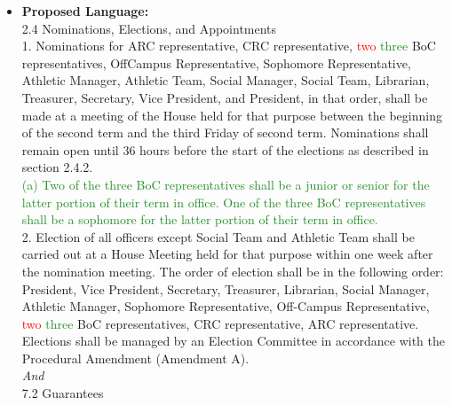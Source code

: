 \documentclass[10pt]{article} %
\begin{document}
\begin{itemize}
	(b) for the entire academic year following the election or appointment provided the officer completes their term. If an officer quits their office mid-term, the room guarantee shall transfer to the succeeding officeholder for the remainder of the guaranteed term. \\
	8. The officer room pick order shall be President, Vice President, Secretary, Treasurer, Librarian, Social Manager, Athletic Manager, Head UCC, On Campus UCCs, IHC Chair, ASCIT President, BoC Chair, Social Team, Athletic Team, House-elected BoC Representatives (up to two members), O’Domhnaill’s Suppliers (up to two members), House Head Waiter (one member), House BFD editors (one member), House Historians (one member).
	\item \textbf{Proposed Language:} \\
	2.4 Nominations, Elections, and Appointments \\
	1. Nominations for ARC representative, CRC representative, \textcolor{red}{two} \textcolor{ForestGreen}{three} BoC representatives, OffCampus Representative, Sophomore Representative, Athletic Manager, Athletic Team, Social Manager, Social Team, Librarian, Treasurer, Secretary, Vice President, and President, in that order, shall be made at a meeting of the House held for that purpose between the beginning of the second term and the third Friday of second term. Nominations shall remain open until 36 hours before the start of the elections as described in section 2.4.2. \\
	\textcolor{ForestGreen}{(a) Two of the three BoC representatives shall be a junior or senior for the latter portion of their term in office. One of the three BoC representatives shall be a sophomore for the latter portion of their term in office.} \\
	2. Election of all officers except Social Team and Athletic Team shall be carried out at a House Meeting held for that purpose within one week after the nomination meeting. The order of election shall be in the following order: President, Vice President, Secretary, Treasurer, Librarian, Social Manager, Athletic Manager, Sophomore Representative, Off-Campus Representative, \textcolor{red}{two} \textcolor{ForestGreen}{three} BoC representatives, CRC representative, ARC representative. Elections shall be managed by an Election Committee in accordance with the Procedural Amendment (Amendment A). \\
	\textit{And} \\
	7.2 Guarantees \\

\end{itemize}
\end{document}
